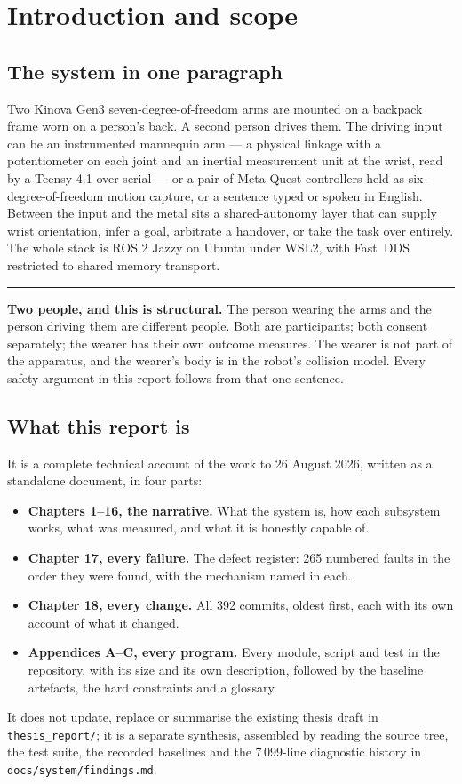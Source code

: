 \documentclass[11pt,a4paper,oneside]{report}
\newcommand{\file}[1]{\texttt{\small #1}}
\newcommand{\keyfact}[1]{%
  \par\vspace{7pt}\noindent
  \hspace*{0pt}\textcolor{srlblue}{\rule{2.5pt}{\dimexpr\baselineskip\relax}}%
  \hspace{9pt}%
  \begin{minipage}[t]{\dimexpr\textwidth-14pt\relax}
  \small #1
  \end{minipage}\par\vspace{7pt}}
\begin{document}
\tableofcontents

\chapter{Introduction and scope}

\section{The system in one paragraph}

Two Kinova Gen3 seven-degree-of-freedom arms are mounted on a backpack frame
worn on a person's back. A second person drives them. The driving input can be
an instrumented mannequin arm --- a physical linkage with a potentiometer on
each joint and an inertial measurement unit at the wrist, read by a Teensy 4.1
over serial --- or a pair of Meta Quest controllers held as six-degree-of-freedom
motion capture, or a sentence typed or spoken in English. Between the input
and the metal sits a shared-autonomy layer that can supply wrist orientation,
infer a goal, arbitrate a handover, or take the task over entirely. The whole
stack is ROS 2 Jazzy on Ubuntu under WSL2, with Fast~DDS restricted to shared
memory transport.

\keyfact{\textbf{Two people, and this is structural.} The person wearing the
arms and the person driving them are different people. Both are participants;
both consent separately; the wearer has their own outcome measures. The wearer
is not part of the apparatus, and the wearer's body is in the robot's
collision model. Every safety argument in this report follows from that one
sentence.}

\section{What this report is}

It is a complete technical account of the work to 26 August 2026, written as a
standalone document, in four parts:

\begin{itemize}
\item \textbf{Chapters 1--16, the narrative.} What the system is, how each
      subsystem works, what was measured, and what it is honestly capable of.
\item \textbf{Chapter 17, every failure.} The defect register: 265 numbered
      faults in the order they were found, with the mechanism named in each.
\item \textbf{Chapter 18, every change.} All 392 commits, oldest first, each
      with its own account of what it changed.
\item \textbf{Appendices A--C, every program.} Every module, script and test in
      the repository, with its size and its own description, followed by the
      baseline artefacts, the hard constraints and a glossary.
\end{itemize}
 It does not update, replace or summarise the existing
thesis draft in \file{thesis\_report/}; it is a separate synthesis, assembled
by reading the source tree, the test suite, the recorded baselines and the
7\,099-line diagnostic history in \file{docs/system/findings.md}.
\end{document}

